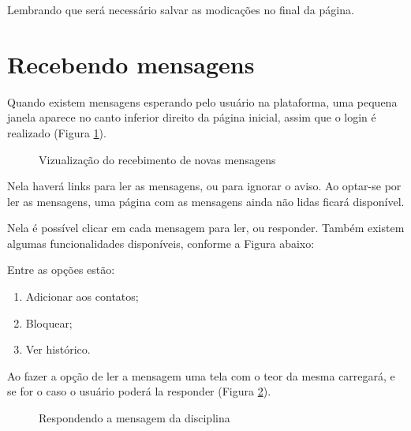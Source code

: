 Lembrando que será necessário salvar as modicações no final da página.

\section{Recebendo mensagens}
Quando existem mensagens esperando pelo usuário na plataforma, uma pequena janela aparece no canto inferior direito da página inicial, assim que o login é realizado (Figura \ref{fig:cap2_14}).

\begin{figure}[htbp]
 \begin{center}
  \caption{Vizualização do recebimento de novas mensagens}
  \label{fig:cap2_14}
 \end{center}
\end{figure}

Nela haverá links para ler as mensagens, ou para ignorar o aviso.
Ao optar-se por ler as mensagens, uma página com as mensagens ainda não lidas ficará disponível.


 \begin{center}
 \end{center}


Nela é possível clicar em cada mensagem para ler, ou responder. Também existem algumas funcionalidades disponíveis, conforme a Figura abaixo:


 \begin{center}
 \end{center}


Entre as opções estão:

\begin{enumerate}
\item Adicionar aos contatos;
\item Bloquear;
\item Ver histórico.
\end{enumerate}

Ao fazer a opção de ler a mensagem uma tela com o teor da mesma carregará, e se for o caso o usuário poderá la responder (Figura \ref{fig:cap2_17}).

\begin{figure}[!htbp]
 \begin{center}
  \caption{Respondendo a mensagem da disciplina}
  \label{fig:cap2_17}
 \end{center}
\end{figure}


